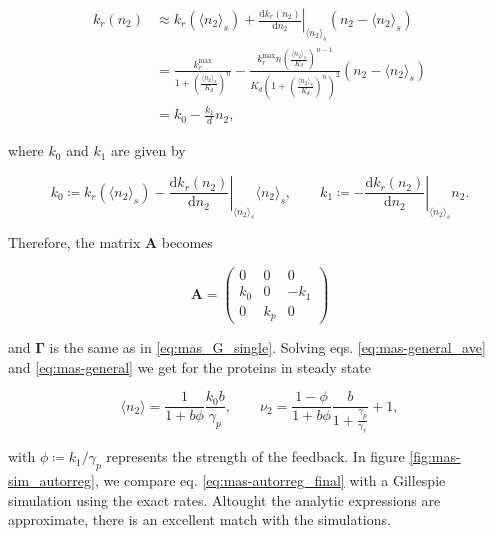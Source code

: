 \begin{equation}
  \begin{split}
  k_r(n_2) &\approx k_r(\langle n_2\rangle_s) + \left.\frac{\mathrm{d}k_r(n_2)}{\mathrm{d}n_2}\right|_{\langle n_2\rangle_s}\left(n_2-\langle n_2\rangle_s\right)\\
  &=\frac{k_r^{\text{max}}}{1+\left(\frac{\langle n_2\rangle_s}{K_d}\right)^n} - \frac{k_r^{\text{max}}n\left(\frac{\langle n_2\rangle_s}{K_d}\right)^{n-1}}{K_d\left(1+\left(\frac{\langle n_2\rangle_s}{K_d}\right)^n\right)^2}\left(n_2-\langle n_2\rangle_s\right)\\
  &= k_0-\frac{k_1}{d}n_2,
  \end{split}
\end{equation} 

where $k_0$ and $k_1$ are given by

\begin{equation*}
  k_0\coloneqq k_r(\langle n_2\rangle_s) - \left.\frac{\mathrm{d}k_r(n_2)}{\mathrm{d}n_2}\right|_{\langle n_2\rangle_s}\langle n_2\rangle_s,\quad\quad k_1 \coloneqq -\left.\frac{\mathrm{d}k_r(n_2)}{\mathrm{d}n_2}\right|_{\langle n_2\rangle_s}n_2. 
\end{equation*}

Therefore, the matrix $\mathbf{A}$ becomes

\begin{equation*}
  \mathbf{A} =
  \begin{pmatrix}
    0 & 0 & 0 \\
    k_0 & 0 & -k_1 \\
    0 & k_p & 0
  \end{pmatrix}
\end{equation*}

and $\mathbf{\Gamma}$ is the same as in \eqref{eq:mas_G_single}. Solving eqs. \eqref{eq:mas-general_ave} and \eqref{eq:mas-general} we get for the proteins in steady state

\begin{equation}
  \label{eq:mas-autorreg_final}
  \langle n_2\rangle = \frac{1}{1+b\phi}\frac{k_0b}{\gamma_p},\quad\quad \nu_2 = \frac{1-\phi}{1+b\phi}\frac{b}{1+\frac{\gamma_p}{\gamma_r}}+1,
\end{equation}

with $\phi\coloneqq k_1/\gamma_p$ represents the strength of the feedback. In figure \ref{fig:mas-sim_autorreg}, we compare eq. \eqref{eq:mas-autorreg_final}  with a Gillespie simulation using the exact rates. Altought the analytic expressions are approximate, there is an excellent match with the simulations.

